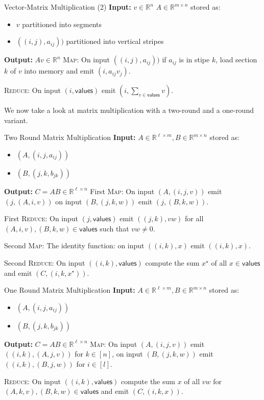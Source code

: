 \documentclass[english]{panikzettel}
\begin{document}
\begin{algo}{Vector-Matrix Multiplication (2)}
\textbf{Input:} $v \in \mathbb{R}^n$ $A \in \mathbb{R}^{m \times n}$ stored as:
\begin{itemize}
	\item $v$ partitioned into segments
	\item $((i,j),a_{ij}))$ partitioned into vertical stripes
\end{itemize}

\textbf{Output:} $Av \in \mathbb{R}^n$
\tcblower
\textsc{Map}: On input $((i,j),a_{ij}))$ if $a_{ij}$ is in stipe $k$, load section $k$ of $v$ into memory and emit $(i,a_{ij}v_j)$.

\textsc{Reduce}: On input $(i, \textsf{values})$ emit $(i,\sum_{v \in \textsf{values}} v)$.
\end{algo}

We now take a look at matrix multiplication with a two-round and a one-round variant.

\begin{algo}{Two Round Matrix Multiplication}
\textbf{Input:} $A \in \mathbb{R}^{\ell \times m}, B \in \mathbb{R}^{m \times n}$ stored as:
\begin{itemize}
	\item $(A,(i,j,a_{ij}))$
	\item $(B,(j,k,b_{jk}))$
\end{itemize}

\textbf{Output:} $C = AB \in \mathbb{R}^{\ell \times n}$
\tcblower
First \textsc{Map}: On input $(A,(i,j,v))$ emit $(j,(A,i,v))$ on input $(B,(j,k,w))$ emit $(j,(B,k,w))$.

First \textsc{Reduce}: On input $(j, \textsf{values})$ emit $((j,k),vw)$ for all $(A,i,v),(B,k,w) \in \textsf{values}$ such that $vw \neq 0$.

Second \textsc{Map}: The identity function: on input $((i,k),x)$ emit $((i,k),x)$.

Second \textsc{Reduce}: On input $((i,k), \textsf{values})$ compute the sum $x^\star$ of all $x \in \textsf{values}$ and emit $(C,(i,k,x^\star))$.
\end{algo}

\begin{algo}{One Round Matrix Multiplication}
\textbf{Input:} $A \in \mathbb{R}^{\ell \times m}, B \in \mathbb{R}^{m \times n}$ stored as:
\begin{itemize}
	\item $(A,(i,j,a_{ij}))$
	\item $(B,(j,k,b_{jk}))$
\end{itemize}

\textbf{Output:} $C = AB \in \mathbb{R}^{\ell \times n}$
\tcblower
\textsc{Map}: On input $(A,(i,j,v))$ emit $((i,k),(A,j,v))$ for $k \in [n]$, on input $(B,(j,k,w))$ emit $((i,k),(B,j,w))$ for $i \in [l]$.

\textsc{Reduce}: On input $((i,k), \textsf{values})$ compute the sum $x$ of all $vw$ for $(A,k,v),(B,k,w) \in \textsf{values}$ and emit $(C,(i,k,x))$.
\end{algo}
\end{document}
